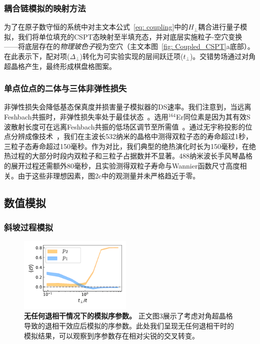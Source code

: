 \documentclass[preprint,superscriptaddress,floatfix, nofootinbib]{revtex4-2}
\begin{document}
\begin{CJK*}{UTF8}{gbsn}
\subsubsection*{耦合链模拟的映射方法}

为了在原子数守恒的系统中对主文本公式~\eqref{eq: coupling}中的$H_\perp$耦合进行量子模拟，我们将单位填充的CSPT态映射至半填充态，并对底层实施粒子-空穴变换——将底层存在的\textit{物理玻色子}视为空穴（主文本图~\ref{fig: Coupled_CSPT}a底部）。在此表示下，配对项($\Delta_\perp$)转化为可实验实现的层间跃迁项($t_\perp$)。交错势场通过对角超晶格产生，最终形成棋盘格图案。
\subsubsection*{单点位点的二体与三体非弹性损失}

非弹性损失会降低基态保真度并损害量子模拟器的DS速率。我们注意到，当远离Feshbach共振时，非弹性损失率处于最佳状态~\cite{Chin2010, Frisch2014}。选用$^{164}$Er同位素是因为其有效S波散射长度可在远离Feshbach共振的低场区调节至所需值~\cite{Patscheider2022}。通过无宇称投影的位点分辨成像技术~\cite{Su2024}，我们在主波长532纳米的晶格中测得双粒子态的寿命超过1秒，三粒子态寿命超过150毫秒。作为对比，我们典型的绝热演化时长为150毫秒，在绝热过程的大部分时段内双粒子和三粒子占据数并不显著。488纳米波长手风琴晶格的展开过程还需额外80毫秒，且实验测得双粒子寿命与Wannier函数尺寸高度相关。由于这些非理想因素，图2c中的观测量并未严格趋近于零。
\subsection*{数值模拟}


\subsubsection*{斜坡过程模拟}
\begin{figure}
    \centering
    \includegraphics[width=0.48\textwidth]{figures/Coupled_CSPT_OP_gnd_state_no_decoherence.pdf}
    \caption{\textbf{无任何退相干情况下的模拟序参数。} 正文图3展示了考虑对角超晶格导致的退相干效应后模拟的序参数。此处我们呈现无任何退相干时的模拟结果，可以观察到序参数存在相对尖锐的交叉转变。
    }
    \label{fig: Coupled_CSPT_no_decoherence}
\end{figure}


\end{CJK*}
\end{document}
